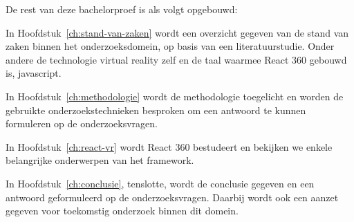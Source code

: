 
De rest van deze bachelorproef is als volgt opgebouwd:

In Hoofdstuk~\ref{ch:stand-van-zaken} wordt een overzicht gegeven van de stand van zaken binnen het onderzoeksdomein, op basis van een literatuurstudie. Onder andere de technologie virtual reality zelf en de taal waarmee React 360 gebouwd is, javascript.

In Hoofdstuk~\ref{ch:methodologie} wordt de methodologie toegelicht en worden de gebruikte onderzoekstechnieken besproken om een antwoord te kunnen formuleren op de onderzoeksvragen.

In Hoofdstuk~\ref{ch:react-vr} wordt React 360 bestudeert en bekijken we enkele belangrijke onderwerpen van het framework.

In Hoofdstuk~\ref{ch:conclusie}, tenslotte, wordt de conclusie gegeven en een antwoord geformuleerd op de onderzoeksvragen. Daarbij wordt ook een aanzet gegeven voor toekomstig onderzoek binnen dit domein.


